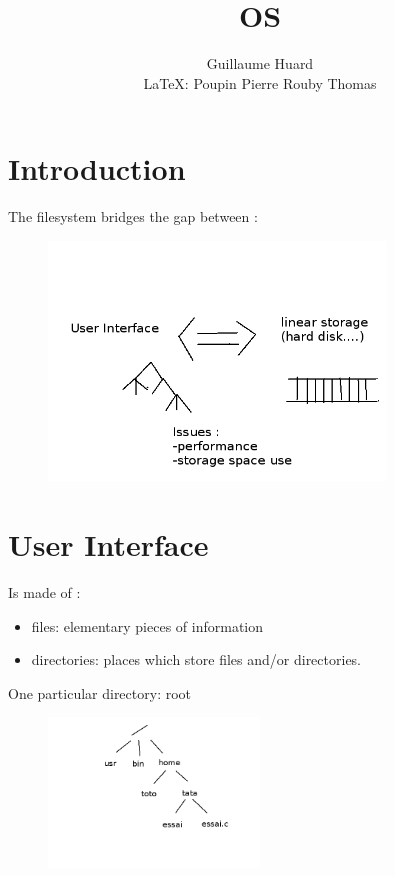 \documentclass[a4paper,10pt]{report}
\title{OS}
\author{Guillaume Huard \\
	\LaTeX : Poupin Pierre Rouby Thomas
}
\date{}
\begin{document}
\maketitle


\section{Introduction}

The filesystem bridges the gap between :
\begin{figure}[h!]
  \begin{center}
    \includegraphics[width=0.8\textwidth]{filesystem.png}
  \end{center}
\end{figure}

\section{User Interface}

Is made of :

\begin{itemize}
  \item files: elementary pieces of information
  \item directories: places which store files and/or directories.
\end{itemize}
  
  One particular directory: root
  \begin{figure}[h!]
  \begin{center}
    \includegraphics[width=0.5\textwidth]{root.png}
  \end{center}
\end{figure}
  
\end{document}
